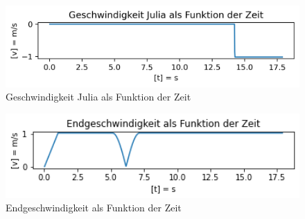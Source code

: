 \documentclass[../main.tex]{subfiles}
\begin{document}
    \begin{figure}[H]
        \begin{center}
            \centerline{\includegraphics[width=155mm]{./images/Inelastisch/GeschwindigkeitJulia}}
            \caption{Geschwindigkeit Julia als Funktion der Zeit}
            \label{fig:GeschwindigkeitJulia}
        \end{center}
    \end{figure}



    \begin{figure}[H]
        \begin{center}
            \centerline{\includegraphics[width=155mm]{./images/Inelastisch/Endgeschwindigkeit}}
            \caption{Endgeschwindigkeit als Funktion der Zeit}
            \label{fig:Endgeschwindigkeit}
        \end{center}
    \end{figure}
\end{document}
